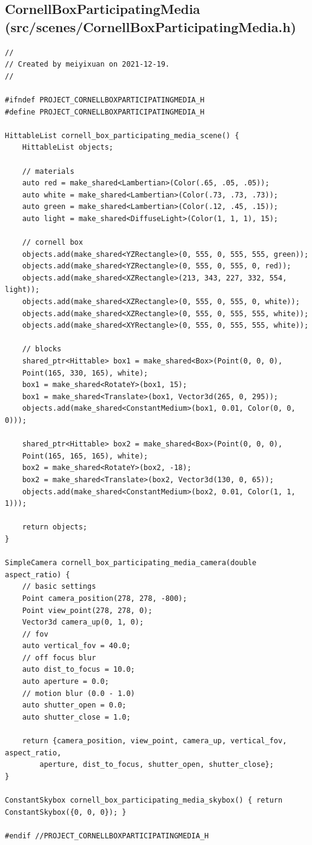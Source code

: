 \documentclass[utf8]{article}
\begin{document}
\subsection{CornellBoxParticipatingMedia (src/scenes/CornellBoxParticipatingMedia.h)}
\begin{lstlisting}[style=CStyle]
//
// Created by meiyixuan on 2021-12-19.
//

#ifndef PROJECT_CORNELLBOXPARTICIPATINGMEDIA_H
#define PROJECT_CORNELLBOXPARTICIPATINGMEDIA_H

HittableList cornell_box_participating_media_scene() {
	HittableList objects;
	
	// materials
	auto red = make_shared<Lambertian>(Color(.65, .05, .05));
	auto white = make_shared<Lambertian>(Color(.73, .73, .73));
	auto green = make_shared<Lambertian>(Color(.12, .45, .15));
	auto light = make_shared<DiffuseLight>(Color(1, 1, 1), 15);
	
	// cornell box
	objects.add(make_shared<YZRectangle>(0, 555, 0, 555, 555, green));
	objects.add(make_shared<YZRectangle>(0, 555, 0, 555, 0, red));
	objects.add(make_shared<XZRectangle>(213, 343, 227, 332, 554, light));
	objects.add(make_shared<XZRectangle>(0, 555, 0, 555, 0, white));
	objects.add(make_shared<XZRectangle>(0, 555, 0, 555, 555, white));
	objects.add(make_shared<XYRectangle>(0, 555, 0, 555, 555, white));
	
	// blocks
	shared_ptr<Hittable> box1 = make_shared<Box>(Point(0, 0, 0),
	Point(165, 330, 165), white);
	box1 = make_shared<RotateY>(box1, 15);
	box1 = make_shared<Translate>(box1, Vector3d(265, 0, 295));
	objects.add(make_shared<ConstantMedium>(box1, 0.01, Color(0, 0, 0)));
	
	shared_ptr<Hittable> box2 = make_shared<Box>(Point(0, 0, 0),
	Point(165, 165, 165), white);
	box2 = make_shared<RotateY>(box2, -18);
	box2 = make_shared<Translate>(box2, Vector3d(130, 0, 65));
	objects.add(make_shared<ConstantMedium>(box2, 0.01, Color(1, 1, 1)));
	
	return objects;
}

SimpleCamera cornell_box_participating_media_camera(double aspect_ratio) {
	// basic settings
	Point camera_position(278, 278, -800);
	Point view_point(278, 278, 0);
	Vector3d camera_up(0, 1, 0);
	// fov
	auto vertical_fov = 40.0;
	// off focus blur
	auto dist_to_focus = 10.0;
	auto aperture = 0.0;
	// motion blur (0.0 - 1.0)
	auto shutter_open = 0.0;
	auto shutter_close = 1.0;
	
	return {camera_position, view_point, camera_up, vertical_fov, aspect_ratio,
		aperture, dist_to_focus, shutter_open, shutter_close};
}

ConstantSkybox cornell_box_participating_media_skybox() { return ConstantSkybox({0, 0, 0}); }

#endif //PROJECT_CORNELLBOXPARTICIPATINGMEDIA_H

\end{lstlisting}
\end{document}
